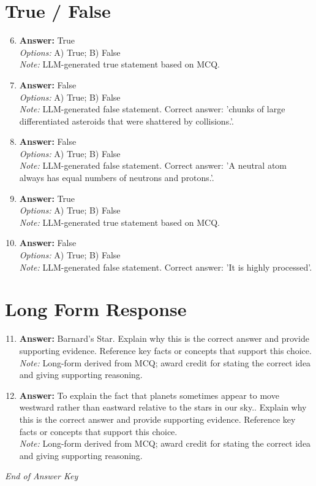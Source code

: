 \documentclass[12pt]{article}
\begin{document}
\section*{True / False}
\begin{enumerate}[label=\arabic*.]
\setcounter{enumi}{5}
\item \textbf{Answer:} True
\\ \textit{Options:} A) True; B) False
\\ \textit{Note:} LLM-generated true statement based on MCQ.
\item \textbf{Answer:} False
\\ \textit{Options:} A) True; B) False
\\ \textit{Note:} LLM-generated false statement. Correct answer: 'chunks of large differentiated asteroids that were shattered by collisions.'.
\item \textbf{Answer:} False
\\ \textit{Options:} A) True; B) False
\\ \textit{Note:} LLM-generated false statement. Correct answer: 'A neutral atom always has equal numbers of neutrons and protons.'.
\item \textbf{Answer:} True
\\ \textit{Options:} A) True; B) False
\\ \textit{Note:} LLM-generated true statement based on MCQ.
\item \textbf{Answer:} False
\\ \textit{Options:} A) True; B) False
\\ \textit{Note:} LLM-generated false statement. Correct answer: 'It is highly processed'.
\end{enumerate}

\section*{Long Form Response}
\begin{enumerate}[label=\arabic*.]
\setcounter{enumi}{10}
\item \textbf{Answer:} Barnard's Star. Explain why this is the correct answer and provide supporting evidence. Reference key facts or concepts that support this choice.
\\ \textit{Note:} Long-form derived from MCQ; award credit for stating the correct idea and giving supporting reasoning.
\item \textbf{Answer:} To explain the fact that planets sometimes appear to move westward rather than eastward relative to the stars in our sky.. Explain why this is the correct answer and provide supporting evidence. Reference key facts or concepts that support this choice.
\\ \textit{Note:} Long-form derived from MCQ; award credit for stating the correct idea and giving supporting reasoning.
\end{enumerate}

\vfill
\noindent\textit{End of Answer Key}
\end{document}
